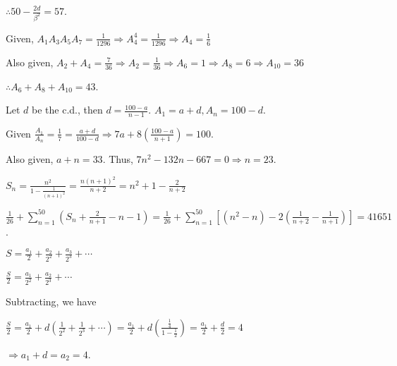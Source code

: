   $\therefore 50 - \frac{2d}{\beta^2} = 57$.
\item Given, $A_1A_3A_5A_7 = \frac{1}{1296}\Rightarrow A_4^4 = \frac{1}{1296}\Rightarrow A_4 = \frac{1}{6}$

  Also given, $A_2 + A_4 = \frac{7}{36}\Rightarrow A_2 = \frac{1}{36}\Rightarrow A_6 = 1\Rightarrow A_8 = 6
  \Rightarrow A_{10} = 36$

  $\therefore A_6 + A_8 + A_{10} = 43$.
\item Let $d$ be the c.d., then $d = \frac{100 - a}{n - 1}$. $A_1 = a + d, A_n = 100 - d$.

  Given $\frac{A_1}{A_n} = \frac{1}{7} = \frac{a + d}{100 - d}\Rightarrow 7a + 8\left(\frac{100 - a}{n +
    1}\right) = 100$.

  Also given, $a + n = 33$. Thus, $7n^2 - 132n - 667 = 0\Rightarrow n = 23$.
\item $S_n = \frac{n^2}{1 - \frac{1}{(n + 1)^2}} = \frac{n(n + 1)^2}{n + 2} = n^2 + 1 - \frac{2}{n + 2}$

  $\frac{1}{26} + \displaystyle\sum_{n = 1}^{50}\left(S_n + \frac{2}{n + 1} - n - 1\right) = \frac{1}{26} +
  \sum_{n = 1}^{50}\left[(n^2 - n) - 2\left(\frac{1}{n + 2} - \frac{1}{n + 1}\right)\right] = 41651$.
\item $S = \frac{a_1}{2} + \frac{a_2}{2^2} + \frac{a_3}{2^3} + \cdots$

  $\frac{S}{2} = \frac{a_1}{2^2} + \frac{a_2}{2^3} + \cdots$

  Subtracting, we have

  $\frac{S}{2} = \frac{a_1}{2} + d\left(\frac{1}{2^2} + \frac{1}{2^3} + \cdots\right) = \frac{a_1}{2} +
  d\left(\frac{\frac{1}{4}}{1 - \frac{1}{2}}\right) = \frac{a_1}{2} + \frac{d}{2} = 4$

  $\Rightarrow a_1 + d = a_2 = 4$.
\stopitemize
